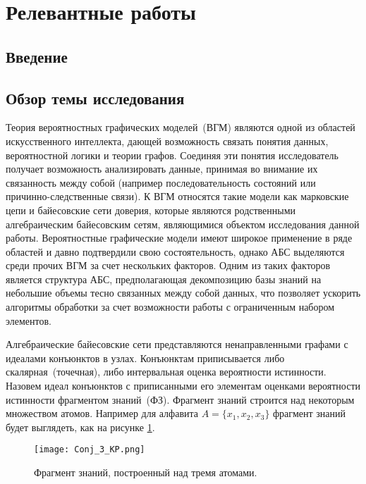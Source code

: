 \section{Релевантные работы}
\subsection{Введение}


\subsection{Обзор темы исследования}
 Теория вероятностных графических моделей~(ВГМ) являются одной из областей искусственного интеллекта, дающей возможность связать понятия данных, вероятностной логики и теории графов. Соединяя эти понятия исследователь получает возможность анализировать данные, принимая во внимание их связанность между собой (например последовательность состояний или причинно-следственные связи). К ВГМ относятся такие модели как марковские цепи и байесовские сети доверия, которые являются родственными алгебраическим байесовским сетям, являющимися объектом исследования данной работы. Вероятностные графические модели имеют широкое применение в ряде областей и давно подтвердили свою состоятельность, однако АБС выделяются среди прочих ВГМ за счет нескольких факторов. Одним из таких факторов  является структура АБС, предполагающая декомпозицию базы знаний на небольшие объемы тесно связанных между собой данных, что позволяет ускорить алгоритмы обработки за счет возможности работы с ограниченным набором элементов. 
 

 
Алгебраические байесовские сети представляются ненаправленными графами с идеалами конъюнктов в узлах. Конъюнктам приписывается либо скалярная~(точечная), либо интервальная оценка вероятности истинности. Назовем идеал конъюнктов с приписанными его элементам оценками вероятности истинности фрагментом знаний~(ФЗ). Фрагмент знаний строится над некоторым множеством атомов. Например для алфавита $A = \{x_1,x_2,x_3\}$  фрагмент знаний будет выглядеть, как на рисунке \ref{KP_3}. 

\begin{figure}[h!]
  \begin{center}
    \texttt{[image: Conj\_3\_KP.png]}
    \caption{Фрагмент знаний, построенный над тремя атомами.}
    \label{KP_3}
  \end{center}
\end{figure}


